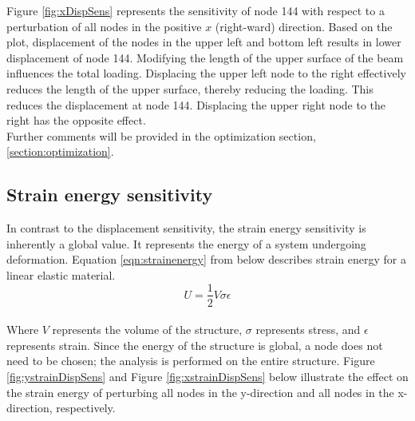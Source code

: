 Figure \ref{fig:xDispSens} represents the sensitivity of node 144 with respect to a perturbation of all nodes in the positive $x$ (right-ward) direction. Based on the plot, displacement of the nodes in the upper left and bottom left results in lower displacement of node 144. Modifying the length of the upper surface of the beam influences the total loading. Displacing the upper left node to the right effectively reduces the length of the upper surface, thereby reducing the loading. This reduces the displacement at node 144. Displacing the upper right node to the right has the opposite effect.\\[6pt]
Further comments will be provided in the optimization section, \ref{section:optimization}.

\subsection{Strain energy sensitivity} \label{section:strainSens}
In contrast to the displacement sensitivity, the strain energy sensitivity is inherently a global value. It represents the energy of a system undergoing deformation. Equation \ref{eqn:strainenergy} from \cite{wiki:strainEnergy} below describes strain energy for a linear elastic material.\\
\begin{equation} \label{eqn:strainenergy}
U = \frac{1}{2}V\sigma\epsilon
\end{equation}\\
Where $V$ represents the volume of the structure, $\sigma$ represents stress, and $\epsilon$ represents strain. Since the energy of the structure is global, a node does not need to be chosen; the analysis is performed on the entire structure. Figure \ref{fig:ystrainDispSens} and Figure \ref{fig:xstrainDispSens} below illustrate the effect on the strain energy of perturbing all nodes in the y-direction and all nodes in the x-direction, respectively. \\
